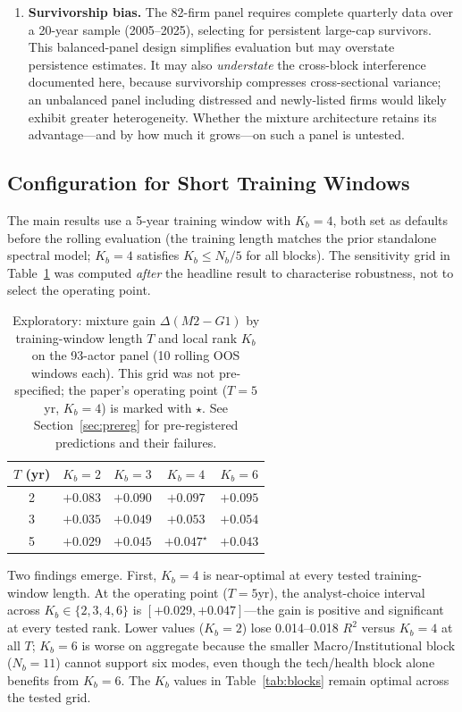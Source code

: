 \documentclass[11pt,a4paper]{article}
\begin{document}
\begin{enumerate}[nosep]
  \item \textbf{Survivorship bias.} The 82-firm panel requires complete quarterly data over a 20-year sample (2005--2025), selecting for persistent large-cap survivors. This balanced-panel design simplifies evaluation but may overstate persistence estimates. It may also \emph{understate} the cross-block interference documented here, because survivorship compresses cross-sectional variance; an unbalanced panel including distressed and newly-listed firms would likely exhibit greater heterogeneity. Whether the mixture architecture retains its advantage---and by how much it grows---on such a panel is untested.
\end{enumerate}

\subsection{Configuration for Short Training Windows}
\label{sec:parsimony}

The main results use a 5-year training window with $K_b{=}4$, both set as defaults before the rolling evaluation (the training length matches the prior standalone spectral model; $K_b{=}4$ satisfies $K_b \leq N_b/5$ for all blocks). The sensitivity grid in Table~\ref{tab:parsimony} was computed \emph{after} the headline result to characterise robustness, not to select the operating point.

\begin{table}[ht]
\centering
\caption{Exploratory: mixture gain $\Delta(M2 - G1)$ by training-window length $T$ and local rank $K_b$ on the 93-actor panel (10 rolling OOS windows each). This grid was not pre-specified; the paper's operating point ($T{=}5$yr, $K_b{=}4$) is marked with $\star$. See Section~\ref{sec:prereg} for pre-registered predictions and their failures.}
\label{tab:parsimony}
\small
\begin{tabular}{ccccc}
\toprule
$T$ (yr) & $K_b{=}2$ & $K_b{=}3$ & $K_b{=}4$ & $K_b{=}6$ \\
\midrule
2 & $+0.083$ & $+0.090$ & $\mathbf{+0.097}$ & $+0.095$ \\
3 & $+0.035$ & $+0.049$ & $+0.053$ & $\mathbf{+0.054}$ \\
5 & $+0.029$ & $+0.045$ & $+0.047^\star$ & $+0.043$ \\
\bottomrule
\end{tabular}
\end{table}

Two findings emerge. First, $K_b{=}4$ is near-optimal at every tested training-window length. At the operating point ($T{=}5$yr), the analyst-choice interval across $K_b \in \{2, 3, 4, 6\}$ is $[+0.029, +0.047]$---the gain is positive and significant at every tested rank. Lower values ($K_b{=}2$) lose 0.014--0.018 $R^2$ versus $K_b{=}4$ at all $T$; $K_b{=}6$ is worse on aggregate because the smaller Macro/Institutional block ($N_b{=}11$) cannot support six modes, even though the tech/health block alone benefits from $K_b{=}6$. The $K_b$ values in Table~\ref{tab:blocks} remain optimal across the tested grid.
\end{document}
